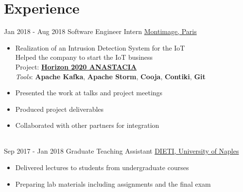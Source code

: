 \documentclass[letterpaper]{twentysecondcv} %
\begin{document}
\makeprofile %


\section{Experience}

\begin{twenty} %
\twentyitem
    	{Jan 2018 -}
		{Aug 2018}
        {Software Engineer Intern}
        {\href{https://www.montimage.com/}{Montimage, Paris}}
        {}
        {
            \begin{itemize}
                \item Realization of an Intrusion Detection System for the IoT\\
                Helped the company to start the IoT business\\
                Project: \href{http://www.anastacia-h2020.eu/}{\textbf{Horizon 2020 ANASTACIA}}\\
                \textit{Tools}: \textbf{Apache Kafka}, \textbf{Apache Storm}, \textbf{Cooja}, \textbf{Contiki}, \textbf{Git}
                \item Presented the work at talks and project meetings
                \item Produced project deliverables
                \item Collaborated with other partners for integration
            \end{itemize}
        }\\
    \twentyitem
   		{Sep 2017 -}
		{Jan 2018}
        {Graduate Teaching Assistant}
        {\href{http://www.scuolapsb.unina.it/}{DIETI, University of Naples}}
        {}
        {
            \begin{itemize}
                \item Delivered lectures to students from undergraduate courses
                \item Preparing lab materials including assignments and the final exam
            \end{itemize}
        }
\end{twenty}
\end{document}

